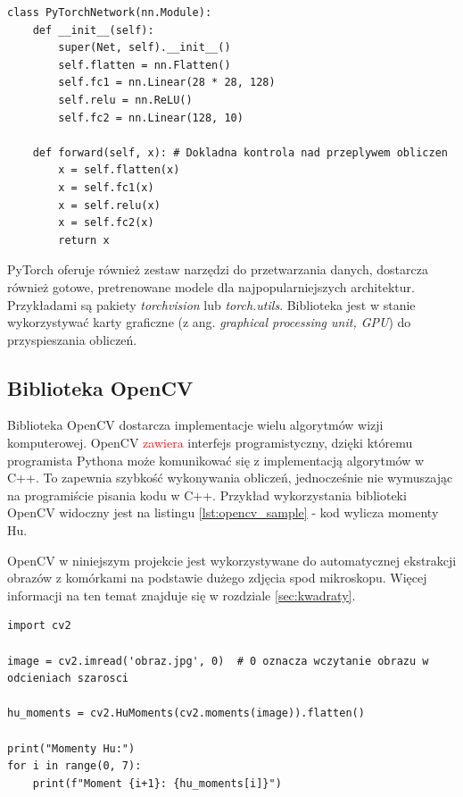 \begin{lstlisting}[language=ipython,caption={Przykładowa sieć neuronowa w PyTorch},label={lst:pytorch_sample}]
class PyTorchNetwork(nn.Module):
    def __init__(self):
        super(Net, self).__init__()
        self.flatten = nn.Flatten()
        self.fc1 = nn.Linear(28 * 28, 128)
        self.relu = nn.ReLU()
        self.fc2 = nn.Linear(128, 10)

    def forward(self, x): # Dokladna kontrola nad przeplywem obliczen
        x = self.flatten(x)
        x = self.fc1(x)
        x = self.relu(x)
        x = self.fc2(x)
        return x
\end{lstlisting}

PyTorch oferuje również zestaw narzędzi do przetwarzania danych, dostarcza również gotowe, pretrenowane modele dla najpopularniejszych architektur.
Przykładami są pakiety \textit{torchvision} lub \textit{torch.utils}. Biblioteka jest w stanie wykorzystywać karty graficzne (z ang. \textit{graphical processing unit, GPU}) do przyspieszania obliczeń.

\subsection{Biblioteka OpenCV}

Biblioteka OpenCV \cite{opencv} dostarcza implementacje wielu algorytmów wizji komputerowej.
OpenCV \textcolor{red}{zawiera} interfejs programistyczny, dzięki któremu programista Pythona może komunikować się z implementacją algorytmów w C++.
To zapewnia szybkość wykonywania obliczeń, jednocześnie nie wymuszając na programiście pisania kodu w C++. Przykład wykorzystania biblioteki OpenCV widoczny jest na listingu \ref{lst:opencv_sample}
- kod wylicza momenty Hu.

OpenCV w niniejszym projekcie jest wykorzystywane do automatycznej ekstrakcji obrazów z komórkami na podstawie dużego zdjęcia spod mikroskopu.
Więcej informacji na ten temat znajduje się w rozdziale \ref{sec:kwadraty}.

\begin{lstlisting}[language=ipython,caption={Obliczenie momentów Hu z użyciem OpenCV}, label={lst:opencv_sample}]
import cv2

image = cv2.imread('obraz.jpg', 0)  # 0 oznacza wczytanie obrazu w odcieniach szarosci

hu_moments = cv2.HuMoments(cv2.moments(image)).flatten()

print("Momenty Hu:")
for i in range(0, 7):
    print(f"Moment {i+1}: {hu_moments[i]}")
\end{lstlisting}

